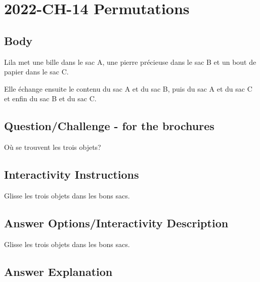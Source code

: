 \documentclass[a4paper,11pt]{report}
\newcommand{\taskGraphicsFolder}{..}
\begin{document}
\section*{\centering{} 2022-CH-14 Permutations}


\subsection*{Body}

Lila met une bille dans le sac A, une pierre précieuse dans le sac B et un bout de papier dans le sac C.

{\centering%
\par}

Elle échange ensuite le contenu du sac A et du sac B, puis du sac A et du sac C et enfin du sac B et du sac C.

{\centering%
\par}

{\em


\subsection*{Question/Challenge - for the brochures}

Où se trouvent les trois objets?

{\centering%
\par}

}


\subsection*{Interactivity Instructions}

Glisse les trois objets dans les bons sacs.

\begingroup
\renewcommand{\arraystretch}{1.5}
\subsection*{Answer Options/Interactivity Description}

Glisse les trois objets dans les bons sacs.

\endgroup

\subsection*{Answer Explanation}
\end{document}
